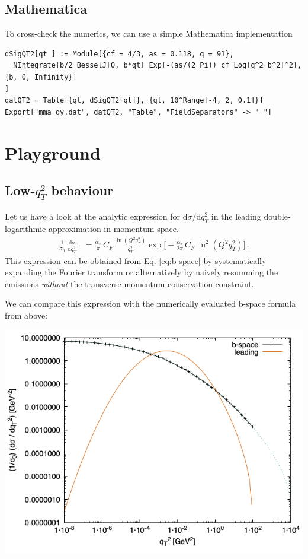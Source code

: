 \documentclass[11pt]{article}
\begin{document}
\subsection{Mathematica}
\label{sec:org00a7960}
To cross-check the numerics, we can use a simple Mathematica implementation
\begin{verbatim}
dSigQT2[qt_] := Module[{cf = 4/3, as = 0.118, q = 91},
  NIntegrate[b/2 BesselJ[0, b*qt] Exp[-(as/(2 Pi)) cf Log[q^2 b^2]^2], {b, 0, Infinity}]
]
datQT2 = Table[{qt, dSigQT2[qt]}, {qt, 10^Range[-4, 2, 0.1]}]
Export["mma_dy.dat", datQT2, "Table", "FieldSeparators" -> " "]
\end{verbatim}


\section{Playground}
\label{sec:org4ccf459}

\subsection{Low-\(q_T^2\) behaviour}
\label{sec:orgb660461}
Let us have a look at the analytic expression for \(\mathrm{d}\sigma/\mathrm{d}q_T^2\) in the leading double-logarithmic approximation in momentum space.
\begin{align}
  \frac{1}{\sigma_0}\,\frac{\mathrm{d}\sigma}{\mathrm{d}q_T^2}
  &=
  \frac{\alpha_s}{\pi}\, C_F \, \frac{\ln(Q^2 q_T^2)}{q_T^2}
  \exp\Big[
    -\frac{\alpha_s}{2\pi}\, C_F \, \ln^2(Q^2 q_T^2)
  \Big]
  \,.
\end{align}
This expression can be obtained from Eq. \eqref{eq:b-space} by systematically expanding the Fourier transform or alternatively by naively resumming the emissions \emph{without} the transverse momentum conservation constraint.

We can compare this expression with the numerically evaluated b-space formula from above:
\begin{center}
\includegraphics[width=.9\linewidth]{plot_QT2.png}
\end{center}
\end{document}
